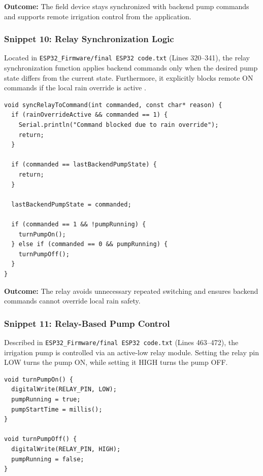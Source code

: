 \textbf{Outcome:} The field device stays synchronized with backend 
pump commands and supports remote irrigation control from the 
application.

\subsubsection{Snippet 10: Relay Synchronization Logic}
\label{subsec:snippet10}

Located in \texttt{ESP32\_Firmware/final ESP32 code.txt} (Lines 320--341), the relay synchronization function applies backend commands only 
when the desired pump state differs from the current state. Furthermore, it explicitly blocks remote ON commands if the local rain override is active \cite{hassebo2024esp32}.

\begin{lstlisting}
void syncRelayToCommand(int commanded, const char* reason) {
  if (rainOverrideActive && commanded == 1) {
    Serial.println("Command blocked due to rain override");
    return;
  }

  if (commanded == lastBackendPumpState) {
    return;
  }

  lastBackendPumpState = commanded;

  if (commanded == 1 && !pumpRunning) {
    turnPumpOn();
  } else if (commanded == 0 && pumpRunning) {
    turnPumpOff();
  }
}
\end{lstlisting}

\textbf{Outcome:} The relay avoids unnecessary repeated switching 
and ensures backend commands cannot override local rain safety.

\subsubsection{Snippet 11: Relay-Based Pump Control}
\label{subsec:snippet11}

Described in \texttt{ESP32\_Firmware/final ESP32 code.txt} (Lines 463--472), the irrigation pump is controlled via an active-low relay module. Setting the 
relay pin LOW turns the pump ON, while setting it HIGH turns the pump OFF.

\begin{lstlisting}
void turnPumpOn() {
  digitalWrite(RELAY_PIN, LOW);
  pumpRunning = true;
  pumpStartTime = millis();
}

void turnPumpOff() {
  digitalWrite(RELAY_PIN, HIGH);
  pumpRunning = false;
}
\end{lstlisting}

